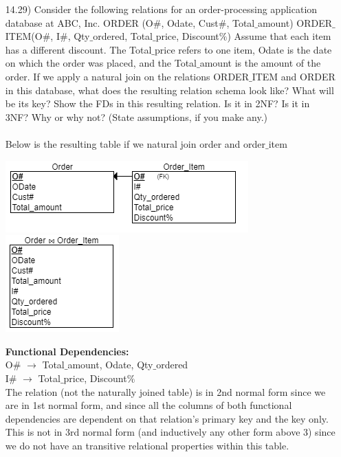 \documentclass[12pt]{article}
\begin{document}
\begin{enumerate}
	\item[14.29)] Consider the following relations for an order-processing application database at ABC, Inc. ORDER (O$\#$, Odate, Cust$\#$, Total$\_$amount) ORDER$\_$ITEM(O$\#$, I$\#$, Qty$\_$ordered, Total$\_$price, Discount$\%$) Assume that each item has a different discount. The Total$\_$price refers to one item, Odate is the date on which the order was placed, and the Total$\_$amount is the amount of the order. If we apply a natural join on the relations ORDER$\_$ITEM and ORDER in this database, what does the resulting relation schema look like? What will be its key? Show the FDs in this resulting relation. Is it in 2NF? Is it in 3NF? Why or why not? (State assumptions, if you make any.) \\ \\
	Below is the resulting table if we natural join order and order$\_$item
	
	\begin{center}
			\includegraphics[scale=1]{hw7r2} \\
			\includegraphics[scale=1]{hw7r3}
	\end{center}
	
	\textbf{Functional Dependencies:} \\
	O$\#$ $\rightarrow$ Total$\_$amount, Odate, Qty$\_$ordered \\
	I$\#$ $\rightarrow$ Total$\_$price, Discount$\%$ \\

	The relation (not the naturally joined table) is in 2nd normal form since we are in 1st normal form, and since all the columns of both functional dependencies are dependent on that relation's primary key and the key only. This is not in 3rd normal form (and inductively any other form above 3) since we do not have an transitive relational properties within this table. \\
	\pagebreak
	

\end{enumerate}
\end{document}
